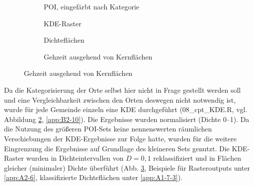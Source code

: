 \documentclass[11pt,pdftex,a4paper]{scrartcl}
\begin{document}
	\begin{figure}[!htb]
		\centering
		\caption[Ermittlung zentralörtlicher Cluster modifiziert nach \textcite{Flex2016}]{Ermittlung zentralörtlicher Cluster modifiziert nach \textcite{Flex2016}. \ref{fig:kde_tt}: Detailansicht um Cluster $A$}
		\label{fig:cpt_detection}
		\begin{subfigure}[ht]{0.49\linewidth}
			\centering
			
			\caption{POI, eingefärbt nach Kategorie}
			\label{fig:kde_poi}
		\end{subfigure}
		\hfill
		\begin{subfigure}[ht]{0.49\linewidth}
			\centering
			
			\caption{KDE-Raster}
			\label{fig:kde_raster}
		\end{subfigure}
		
		\vspace{0.5em}
		
		\begin{subfigure}[ht]{0.49\linewidth}
			\centering
			
			\caption{Dichteflächen}
			\label{fig:kde_parent}
		\end{subfigure}
		\hfill
		\begin{subfigure}[ht]{0.49\linewidth}
			\centering
			
			\caption{Gehzeit ausgehend von Kernflächen}
			\label{fig:kde_tt}
		\end{subfigure}
		\vspace{0.5em}
	\end{figure}
	
	Da die Kategorisierung der Orte selbst hier nicht in Frage gestellt werden soll und eine Vergleichbarkeit zwischen den Orten deswegen nicht notwendig ist, wurde für jede Gemeinde einzeln eine KDE durchgeführt (08\_cpt\_KDE.R, vgl. Abbildung \ref{fig:kde_raster}, \ref{app:B2-10}). Die Ergebnisse wurden normalisiert (Dichte 0--1). Da die Nutzung des größeren POI-Sets keine nennenswerten räumlichen Verschiebungen der KDE-Ergebnisse zur Folge hatte, wurden für die weitere Eingrenzung die Ergebnisse auf Grundlage des kleineren Sets genutzt. Die KDE-Raster wurden in Dichteintervallen von $D=0,1$ reklassifiziert und in Flächen gleicher (minimaler) Dichte überführt (Abb. \ref{fig:kde_parent}, Beispiele für Rasteroutputs unter \ref{app:A2-6}, klassifizierte Dichteflächen unter \ref{app:A1-7-3}).
	
\end{document}
